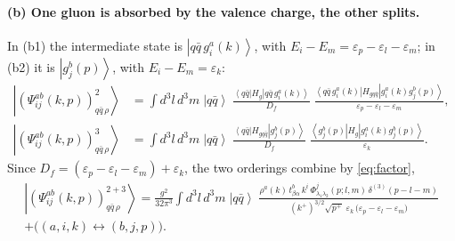 \documentclass[11pt,a4paper]{article}
\numberwithin{equation}{section}
\newcommand{\eps}{\varepsilon}
\newcommand{\dthree}{\delta^{(3)}}
\newcommand{\ket}[1]{\left|#1\right\rangle}
\newcommand{\bra}[1]{\left\langle#1\right|}
\newcommand{\Ph}{\Phi}
\newcommand{\qk}[3]{q^{#1}_{#2}(#3)}
\newcommand{\aqk}[3]{\bar q^{#1}_{#2}(#3)}
\newcommand{\gl}[3]{g^{#1}_{#2}(#3)}
\begin{document}
\paragraph{(b) One gluon is absorbed by the valence charge, the other splits.}
\begin{center}
\hspace{0.5cm}
\end{center}
In (b1) the intermediate state is $\ket{q\bar q\,\gl{a}{i}{k}}$, with
$E_{i}-E_{m}=\eps_{p}-\eps_{l}-\eps_{m}$; in (b2) it is $\ket{\gl{b}{j}{p}}$, with $E_{i}-E_{m}=\eps_{k}$:
\begin{align}
\ket{(\Psi^{ab}_{ij}(k,p))^{2}_{q\bar q\,\rho}}&=\int\!d^{3}l\,d^{3}m\;\ket{q\bar q}\;
\frac{\bra{q\bar q}H_{g}\ket{q\bar q\,\gl{a}{i}{k}}}{D_{f}}\;
\frac{\bra{q\bar q\,\gl{a}{i}{k}}H_{gq\bar q}\ket{\gl{a}{i}{k}\gl{b}{j}{p}}}{\eps_{p}-\eps_{l}-\eps_{m}},
\\
\ket{(\Psi^{ab}_{ij}(k,p))^{3}_{q\bar q\,\rho}}&=\int\!d^{3}l\,d^{3}m\;\ket{q\bar q}\;
\frac{\bra{q\bar q}H_{gq\bar q}\ket{\gl{b}{j}{p}}}{D_{f}}\;
\frac{\bra{\gl{b}{j}{p}}H_{g}\ket{\gl{a}{i}{k}\gl{b}{j}{p}}}{\eps_{k}} .
\end{align}
Since $D_{f}=(\eps_{p}-\eps_{l}-\eps_{m})+\eps_{k}$, the two orderings combine by \eqref{eq:factor},
\begin{multline}
\ket{(\Psi^{ab}_{ij}(k,p))^{2+3}_{q\bar q\,\rho}}=\frac{g^{2}}{32\pi^{3}}\int\!d^{3}l\,d^{3}m\;
\ket{q\bar q}\;
\frac{\rho^{a}(k)\,t^{b}_{\beta\alpha}\,k^{i}\,\Ph^{j}_{\lambda_{1}\lambda_{2}}(p;l,m)\,\dthree(p-l-m)}
{(k^{+})^{3/2}\sqrt{p^{+}}\;\eps_{k}\,\big(\eps_{p}-\eps_{l}-\eps_{m}\big)}\\
+\big((a,i,k)\leftrightarrow(b,j,p)\big) .
\label{eq:B1b}
\end{multline}
\end{document}
